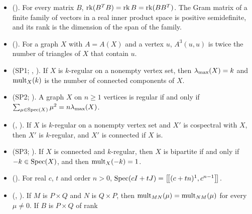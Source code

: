 \begin{itemize}
  $2I+A(X)$ is positive semidefinite if and only if every member of $\Spec(X)$ is at least $-2$.
 \item {}
  (). For every matrix $B$,
  $\mathop{\mathrm{rk}}\nolimits(B^TB)=\mathop{\mathrm{rk}}\nolimits B=\mathop{\mathrm{rk}}\nolimits(BB^T)$. The Gram matrix of a finite family of vectors in a real inner
  product space is positive semidefinite, and its rank is the dimension of the span of the family.
 \item {}
  (). For a graph $X$ with
  $A=A(X)$ and a vertex $u$, $A^3(u,u)$ is twice the number of triangles of $X$ that
  contain $u$.
 \item {} (SP1;
  ,
  ). If $X$ is
  $k$-regular on a nonempty vertex set, then $\lambda_{\max}(X)=k$ and $\mathop{\mathrm{mult}}\nolimits_X(k)$ is the number of
  connected components of $X$.
 \item {} (SP2;
  ). A graph $X$ on $n\ge1$ vertices is
  regular if and only if $\sum_{\mu\in\mathop{\mathrm{Spec}}\nolimits(X)}\mu^2=n\lambda_{\max}(X)$.
 \item {}
  (,
  ). If $X$ is $k$-regular on a nonempty
  vertex set and $X'$ is cospectral with $X$, then $X'$ is $k$-regular, and $X'$ is connected
  if $X$ is.
 \item {} (SP3;
  ). If $X$ is connected and
  $k$-regular, then $X$ is bipartite if and only if $-k\in\mathop{\mathrm{Spec}}\nolimits(X)$, and then $\mathop{\mathrm{mult}}\nolimits_X(-k)=1$.
 \item {}
  (). For real $c$, $t$ and order
  $n>0$, $\mathop{\mathrm{Spec}}\nolimits(cI+tJ)=\left[\!\left[(c+tn)^{1},c^{n-1}\right]\!\right]$.
 \item {}
  (,
  ). If $M$ is $P\times Q$ and $N$ is $Q\times P$,
  then $\mathop{\mathrm{mult}}\nolimits_{MN}(\mu)=\mathop{\mathrm{mult}}\nolimits_{NM}(\mu)$ for every $\mu\ne0$. If $B$ is $P\times Q$ of rank

\end{itemize}
